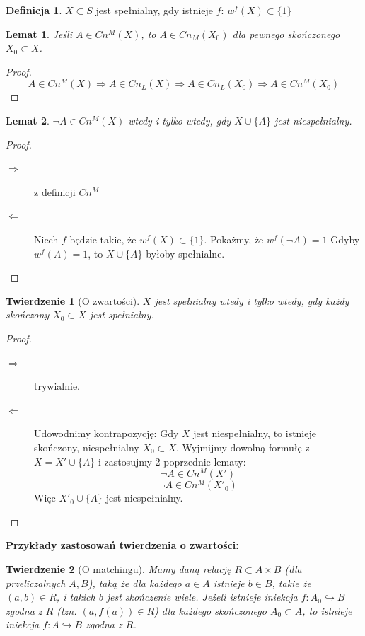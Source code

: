 \documentclass[10pt,a4paper]{article}
\theoremstyle{plain}
\newtheorem{theorem}{Twierdzenie}
\newtheorem{lemma}{Lemat}
\theoremstyle{definition}
\newtheorem*{definition}{Definicja}
\newcommand{\header}[1]{\noindent\textbf{#1}}
\begin{document}
\begin{definition}
$X \subset S$ jest spełnialny, gdy istnieje $f$: $w^f(X) \subset \{1\}$
\end{definition}

\begin{lemma}
Jeśli $A \in Cn^M(X)$, to $A \in Cn_M(X_0)$
dla pewnego skończonego $X_0 \subset X$.
\end{lemma}

\begin{proof}
$$A \in Cn^M(X) \Rightarrow A \in Cn_L(X)
\Rightarrow A \in Cn_L(X_0) \Rightarrow A \in Cn^M(X_0)$$
\end{proof}

\begin{lemma}
$\neg A \in Cn^M(X)$ wtedy i tylko wtedy, gdy $X \cup \{A\}$ jest niespełnialny.
\end{lemma}

\begin{proof}
	~\begin{description}
		\item[$\Rightarrow$] z definicji $Cn^M$
		\item[$\Leftarrow$] Niech $f$ będzie takie, że $w^f(X) \subset\{1\}$.
		Pokażmy, że $w^f(\neg A) = 1$
		Gdyby $w^f(A) = 1$, to $X \cup \{A\}$ byłoby spełnialne.
	\end{description}
\end{proof}

\begin{theorem}[O zwartości]
$X$ jest spełnialny wtedy i tylko wtedy,
gdy każdy skończony $X_0 \subset X$ jest spełnialny.
\end{theorem}

\begin{proof}
	~\begin{description}
		\item[$\Rightarrow$] trywialnie.
		\item[$\Leftarrow$] Udowodnimy kontrapozycję: Gdy $X$ jest niespełnialny,
		to istnieje skończony, niespełnialny $X_0 \subset X$.
		Wyjmijmy dowolną formułę z $X = X' \cup \{A\}$
		i zastosujmy 2 poprzednie lematy:
		$$\neg A \in Cn^M(X')$$
		$$\neg A \in Cn^M(X'_0)$$
		Więc $X'_0 \cup \{A\}$ jest niespełnialny.
	\end{description}
\end{proof}

\header{Przykłady zastosowań twierdzenia o zwartości:}

\begin{theorem}[O matchingu]
Mamy daną relację $R \subset A \times B$ (dla przeliczalnych $A, B$), taką że
dla każdego $a \in A$ istnieje $b \in B$, takie że $(a, b) \in R$, i takich $b$
jest skończenie wiele.
Jeżeli istnieje iniekcja $f: A_0 \hookrightarrow B$ zgodna z $R$
(tzn. $(a, f(a)) \in R$) dla każdego skończonego $A_0 \subset A$, to istnieje
iniekcja $f: A \hookrightarrow B$ zgodna z $R$.
\end{theorem}
\end{document}
